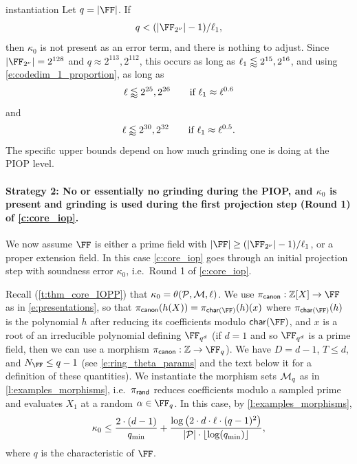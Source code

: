 \begin{lncsappendix}{instantiation}
Let $q=|\FF|$. If
%
$$
q < \fieldboundsizeexponent,
$$
then $\kappa_0$ is not present as an error term, and there is nothing to adjust. Since $|\comfield|=2^{128}$  and $q\approx 2^{113}, 2^{112}$, this occurs as long as $\ell_1 \lessapprox 2^{15},2^{16}$, and using \eqref{e:codedim_1_proportion}, as long as 
%
$$
\ell\lessapprox 2^{25}, 2^{26} \qquad \text{if } \ell_1\approx\ell^{0.6}
$$
 and
$$
\ell\lessapprox 2^{30}, 2^{32} \qquad \text{if } \ell_1\approx\ell^{0.5}.
$$
%
The specific upper bounds depend on how much grinding one is doing at the PIOP level. 






\paragraph{Strategy 2: No or essentially no grinding during the PIOP, and $\kappa_0$ is present and  grinding is used during the first projection step (Round 1) of \cref{c:core_iop}.} We now assume $\FF$ is either a prime field with  $|\FF|\geq \fieldboundsizeexponent$,  or a proper extension field. In this case  \cref{c:core_iop} goes through an initial projection step with soundness error  $\kappa_0$, i.e.\ Round 1 of \cref{c:core_iop}.

Recall (\cref{t:thm_core_IOPP}) that $\kappa_0 = \theta(\mathcal{P},\mathcal{M},\ell)$. We use $\picanon: \ZZ[X]  \to \FF$ as in \cref{e:presentations}, so that $\picanon(h(X))= \pi_{\Char(\FF)}(h)(x)$ where $\pi_{\Char(\FF)}(h)$ is the polynomial $h$ after reducing its coefficients modulo $\Char(\FF)$, and  $x$ is a root of an irreducible polynomial defining $\FF_{q^d}$ (if $d=1$ and so $\FF_{q^d}$ is a prime field, then we can use a morphism $\picanon:\ZZ\to \FF_q$). We have $D=d-1$, $T\leq d$, and $N_\FF\leq q-1$ (see \eqref{e:ring_theta_params} and the text below it for a definition of these quantities). We instantiate the morphism sets $\mathcal{M}_q$ as in \cref{l:examples_morphisms}, i.e.\ $\pi_{\mathsf{rand}}$ reduces coefficients modulo a sampled prime and evaluates $X_1$ at a random $\alpha\in \FF_q$. In this case, by \cref{l:examples_morphisms},
    $$
    \kappa_0 \leq \frac{2\cdot (d-1)}{q_{\min}} + \frac{\log\left(2\cdot d\cdot \ell\cdot (q-1)^2\right)}{|\mathcal{P}|\cdot \lfloor\log(q_{\min})\rfloor},
      $$
    where $q$ is  the characteristic of $\FF$.


\end{lncsappendix}
